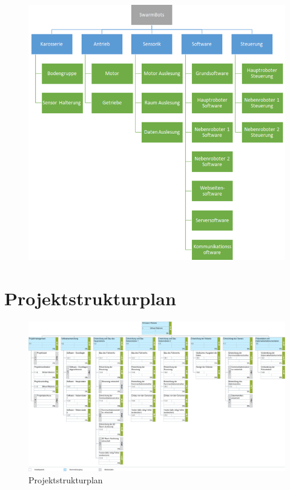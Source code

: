 \begin{figure}[H]
    \centering
    \includegraphics[width=\textwidth]{img/Projektobjektplan.png} 
    \caption{}
\end{figure}

\newpage

\section{Projektstrukturplan}

\begin{figure}[H]
    \centering
    \includegraphics[width=1.4\textwidth, angle=-90]{img/Projektstrukturplan.png}
    \caption{Projektstrukturplan}
    \label{fig:psp}
\end{figure}

